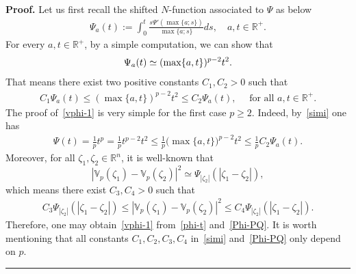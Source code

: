 \documentclass[a4paper, 11pt]{article}
\newenvironment{proof}[1][Proof]{\textbf{#1.} }{\hfill\rule{0.5em}{0.5em}}
\begin{document}
\begin{proof} 
Let us first recall the shifted $N$-function associated to $\Psi$ as below
\begin{align*}
\Psi_a(t) := \int_0^t \frac{s\Psi'(\max\{a;s\})}{\max\{a;s\}}ds, \quad a, t \in \mathbb{R}^+.
\end{align*}
For every $a, t \in \mathbb{R}^+$, by a simple computation, we can show that
\begin{align}\notag
\Psi_a(t) \simeq (\max\{a,t\})^{p-2}t^2.
\end{align}
That means there exist two positive constants $C_1, C_2>0$ such that
\begin{align}\label{simi}
C_1\Psi_a(t) \le (\max\{a,t\})^{p-2}t^2 \le C_2 \Psi_a(t), \quad \mbox{ for all } a,t \in \mathbb{R}^+.
\end{align}
The proof of~\eqref{vphi-1} is very simple for the first case $p \ge 2$. Indeed, by~\eqref{simi} one has
\begin{align}\label{phi-t}
\Psi(t) = \frac{1}{p}t^p = \frac{1}{p} t^{p-2}t^2 \le \frac{1}{p} \big(\max\{a,t\}\big)^{p-2} t^2 \le \frac{1}{p} C_2\Psi_a(t).
\end{align} 
Moreover, for all $\zeta_1, \zeta_2 \in \mathbb{R}^n$, it is well-known that 
$$|\mathbb{V}_{p}(\zeta_1) - \mathbb{V}_{p}(\zeta_2)|^2 \simeq \Psi_{|\zeta_2|}(|\zeta_1-\zeta_2|),$$ which means there exist $C_3, C_4>0$ such that
\begin{align}\label{Phi-PQ}
C_3\Psi_{|\zeta_2|}(|\zeta_1-\zeta_2|) \le |\mathbb{V}_{p}(\zeta_1) - \mathbb{V}_{p}(\zeta_2)|^2 \le C_4 \Psi_{|\zeta_2|}(|\zeta_1-\zeta_2|).
\end{align}
Therefore, one may obtain~\eqref{vphi-1} from~\eqref{phi-t} and~\eqref{Phi-PQ}. It is worth mentioning that all constants $C_1, C_2, C_3, C_4$ in~\eqref{simi} and~\eqref{Phi-PQ} only depend on $p$. \\


\end{proof}
\end{document}
